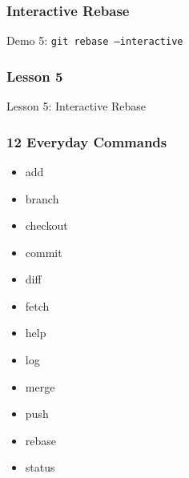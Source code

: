 {\begin{frame}
    \frametitle{Interactive Rebase}
    \alert{Demo 5}: \texttt{git rebase --interactive}
\end{frame}

\begin{frame}
    \frametitle{Lesson 5}
    \alert{Lesson 5}: Interactive Rebase
\end{frame}

\begin{frame}
    \frametitle{12 Everyday Commands}
    \begin{multicols}{3}
        \begin{itemize}
            \setlength\itemsep{3em}
            \item \alert{add}
            \item \alert{branch}
            \item \alert{checkout}
            \item \alert{commit}
            \item \alert{diff}
            \item fetch
            \item \alert{help}
            \item \alert{log}
            \item \alert{merge}
            \item push
            \item \alert{rebase}
            \item \alert{status}
        \end{itemize}
    \end{multicols}
\end{frame}

}
